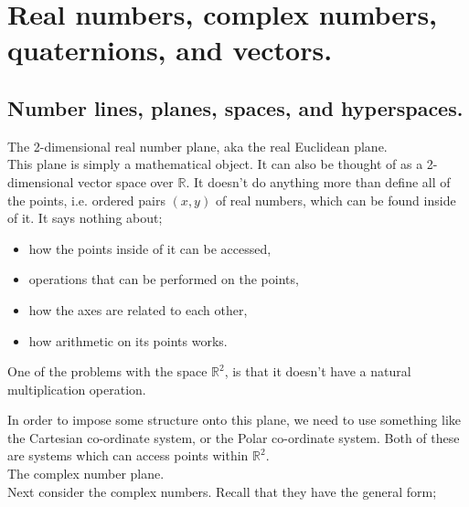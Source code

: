 \chapter{Real numbers, complex numbers, quaternions, and vectors.}

\section{Number lines, planes, spaces, and hyperspaces.}

\textbullet \; The 2-dimensional real number plane, aka the real Euclidean plane. \\



This plane is simply a mathematical object. It can also be thought of as a 2-dimensional vector space over
\(\mathbb{R}\). It doesn't do anything more than define all of the points, i.e. ordered pairs \((x,y)\) of real numbers,
which can be found inside of it. It says nothing about;

\begin{itemize}[itemsep=0pt]
    \item how the points inside of it can be accessed,
    \item operations that can be performed on the points,
    \item how the axes are related to each other,
    \item how arithmetic on its points works.
\end{itemize}

One of the problems with the space \(\mathbb{R}^2\), is that it doesn't have a natural multiplication operation.


In order to impose some structure onto this plane, we need to use something like the Cartesian co-ordinate system, or
the Polar co-ordinate system. Both of these are systems which can access points within \(\mathbb{R}^2\). \\

\textbullet \; The complex number plane. \\

Next consider the complex numbers. Recall that they have the general form;

